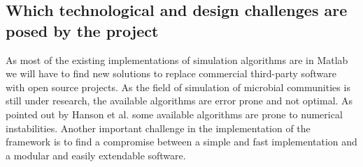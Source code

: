 \subsection*{Which technological and design challenges are posed by the project}

As most of the existing implementations of simulation algorithms are in Matlab we will have to find new solutions to replace commercial
third-party software with open source projects. As the field of simulation of microbial communities is still under research, the available
algorithms are error prone and not optimal. As pointed out by Hanson et al. \cite{6915830} some available algorithms are prone to numerical 
instabilities. Another important challenge in the implementation of the framework is to find a compromise between a simple and fast
implementation and a modular and easily extendable software.

